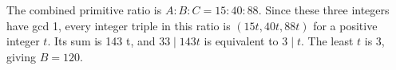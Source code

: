 The combined primitive ratio is $ A:B:C=15:40:88 $. Since these three integers have gcd 1, every integer triple in this ratio is $(15t,40t,88t)$ for a positive integer $ t $. Its sum is 143 t, and $ 33\mid143t $ is equivalent to $ 3\mid t $. The least $ t $ is 3, giving $\boxed{B=120}$.
